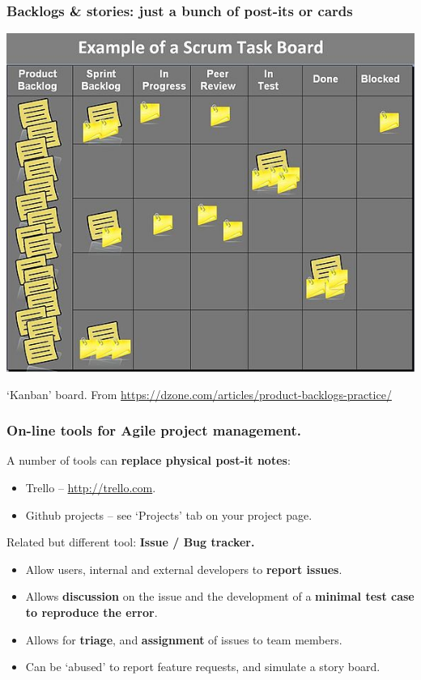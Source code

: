 \documentclass{beamer} %
\newcommand\emc[1]{\textcolor{midred}{\textbf{#1}}}
\begin{document}
\begin{frame}

\frametitle{Backlogs \& stories: just a bunch of post-its or cards}

\begin{center}
\includegraphics[scale=0.50]{assets/backlog} 
\end{center}


`Kanban' board. From \url{https://dzone.com/articles/product-backlogs-practice/}

\end{frame}


\begin{frame}

\frametitle{On-line tools for Agile project management.}

A number of tools can \emc{replace physical post-it notes}:
\begin{itemize}
  \item Trello -- \url{http://trello.com}.
  \item Github projects -- see `Projects' tab on your project page.
\end{itemize}

\vspace{5mm}
Related but different tool: \emc{Issue / Bug tracker.}
\begin{itemize}
  \item Allow users, internal and external developers to \emc{report issues}.
  \item Allows \emc{discussion} on the issue and the development of a \emc{minimal test case to reproduce the error}.
  \item Allows for \emc{triage}, and \emc{assignment} of issues to team members.
  \item Can be `abused' to report feature requests, and simulate a story board.
  \end{itemize}

\end{frame}
\end{document}
